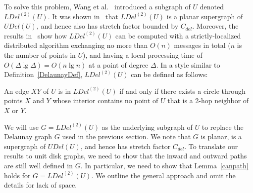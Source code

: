 \documentclass{stacs_proc}
\theoremstyle{plain}\newtheorem{satz}[thm]{Satz}
\begin{document}
To solve this problem, Wang et al.~\cite{iitunbounded1,iitunbounded}
introduced a subgraph of $U$ denoted $LDel^{(2)}(U)$. It was shown
in~\cite{iitunbounded1,iitunbounded} that $LDel^{(2)}(U)$ is a
planar supergraph of $UDel(U)$, and hence also has stretch factor bounded
by $C_{del}$. Moreover, the results in~\cite{gruia,iitbounded} show
how $LDel^{(2)}(U)$ can be computed with a strictly-localized
distributed algorithm exchanging no more than $O(n)$ messages in
total ($n$ is the number of points in $U$), and having a local
processing time of $O(\Delta\lg{\Delta}) = O(n\lg{n})$ at a point of
degree $\Delta$. In a style similar to Definition~\ref{DelaunayDef},
$LDel^{(2)}(U)$ can be defined as follows:
\begin{definition}
\label{ldel2}
An edge $XY$ of $U$ is in $LDel^{(2)}(U)$ if and only if there exists a
circle through points $X$ and $Y$ whose interior contains no point of $U$
that is a 2-hop neighbor of $X$ or $Y$.
\end{definition}
We will use $G=LDel^{(2)}(U)$ as the underlying subgraph
of $U$ to replace the Delaunay graph $G$ used in the previous
section. We note that $G$ is planar, is a
supergraph of $UDel(U)$, and hence has stretch factor $C_{del}$. To
translate our results to unit disk graphs, we need to show that the
inward and outward paths are still well defined in $G$.
In particular, we need to show that Lemma~\ref{canpath} holds for
$G=LDel^{(2)}(U)$. We outline the general approach and omit the
details for lack of space.
\end{document}
